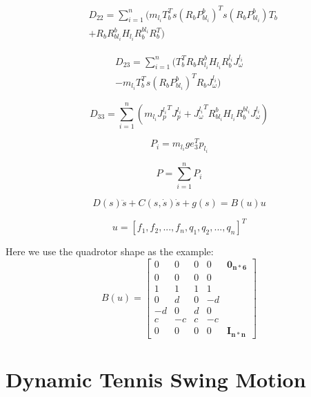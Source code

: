 \documentclass{jarticle}
\begin{document}
\begin{eqnarray}
  & D_{22} = \sum_{i=1}^{n}(m_{l_i} T_b^T s(R_b P_{bl_i}^b)^T s(R_b P_{bl_i}^b) T_b \\ \nonumber
  & + R_b R_{bl_i}^b H_{l_i} R_b^{bl_i} R_b^T)
\end{eqnarray}

\begin{eqnarray}
  D_{23} = \sum_{i=1}^{n}(T_b^T R_b R_{l_i}^b H_{l_i} R_b^{l_i} J_\omega^{l_i} \\
  \nonumber
  - m_{l_i} T_b^T s(R_b P_{bl_i}^b)^T R_b J_\omega^{l_i})
\end{eqnarray}

\begin{equation}
  D_{33} = \sum_{i=1}^{n}(m_{l_i} {J_p^{l_i}}^T J_p^{l_i}
  + {J_\omega^{l_i}}^T R_{bl_i}^b H_{l_i} R_b^{bl_i} J_\omega^{l_i})
\end{equation}

\begin{equation}
  P_i = m_{l_i} g e_3^T p_{l_i}
\end{equation}

\begin{equation}
  P = \sum_{i=1}^{n}{P_i}
\end{equation}

\begin{equation}
  D(s) \ddot{s} + C(s, \dot{s}) \dot{s} + g(s) = B(u) u
\end{equation}

\begin{equation}
  u = [f_1, f_2, ..., f_n, q_1, q_2, ..., q_n]^T
\end{equation}

Here we use the quadrotor shape as the example:
\begin{equation}
  B(u) = \begin{bmatrix}
    0 & 0 & 0 & 0 & \bm{0_{n*6}} \\
    0 & 0 & 0 & 0  \\
    1 & 1 & 1 & 1  \\
    0 & d & 0 & -d \\
    -d & 0 & d & 0 \\
    c & -c & c & -c \\
    0 & 0 & 0 & 0 & \bm{I_{n*n}}
  \end{bmatrix}
\end{equation}



\section{Dynamic Tennis Swing Motion}
\end{document}
